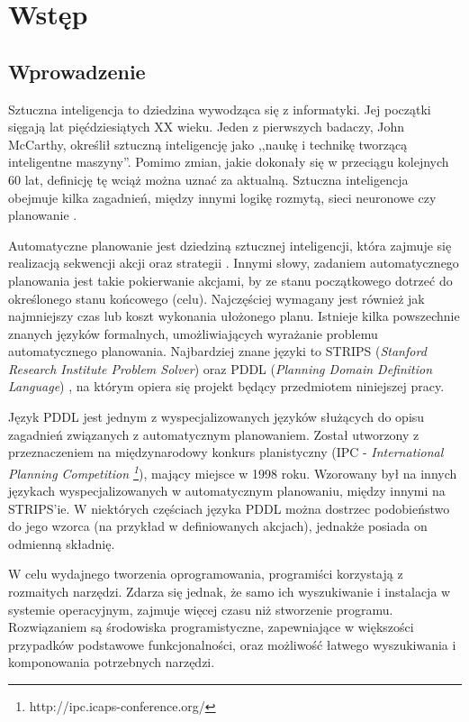 \chapter{Wstęp}
\section{Wprowadzenie}
Sztuczna inteligencja to dziedzina wywodząca się z informatyki. Jej początki sięgają lat pięćdziesiątych XX wieku. Jeden z pierwszych badaczy,  John McCarthy, określił sztuczną inteligencję jako ,,naukę i technikę tworzącą inteligentne maszyny''. Pomimo zmian, jakie dokonały się w przeciągu kolejnych 60 lat, definicję tę wciąż można uznać za aktualną. Sztuczna inteligencja obejmuje kilka zagadnień, między innymi logikę rozmytą, sieci neuronowe czy planowanie \cite{ai}.

Automatyczne planowanie jest dziedziną sztucznej inteligencji, która zajmuje się realizacją sekwencji akcji oraz strategii \cite{planning}. Innymi słowy, zadaniem automatycznego planowania jest takie pokierwanie akcjami, by ze stanu początkowego dotrzeć do określonego stanu końcowego (celu). Najczęściej wymagany jest również jak najmniejszy czas lub koszt wykonania ułożonego planu. Istnieje kilka powszechnie znanych języków formalnych, umożliwiających wyrażanie problemu automatycznego planowania. Najbardziej znane języki to STRIPS (\textit{Stanford Research Institute Problem Solver}) \cite{strips} oraz PDDL (\textit{Planning Domain Definition Language}) \cite{pddl}, na którym opiera się projekt będący przedmiotem niniejszej pracy.
	
Język PDDL jest jednym z wyspecjalizowanych języków służących do opisu zagadnień związanych z automatycznym planowaniem. Został utworzony z przeznaczeniem na międzynarodowy konkurs planistyczny (IPC - \emph{International Planning Competition \footnote{http://ipc.icaps-conference.org/}}), mający miejsce w 1998 roku. Wzorowany był na innych językach wyspecjalizowanych w automatycznym planowaniu, między innymi na STRIPS'ie. W niektórych częściach języka PDDL można dostrzec podobieństwo do jego wzorca (na przykład w definiowanych akcjach), jednakże posiada on odmienną składnię.   

W celu wydajnego tworzenia oprogramowania, programiści korzystają z rozmaitych narzędzi. Zdarza się jednak, że samo ich wyszukiwanie i instalacja w systemie operacyjnym, zajmuje więcej czasu niż stworzenie programu. Rozwiązaniem są środowiska programistyczne, zapewniające w większości przypadków podstawowe funkcjonalności, oraz możliwość łatwego wyszukiwania i komponowania potrzebnych narzędzi.

